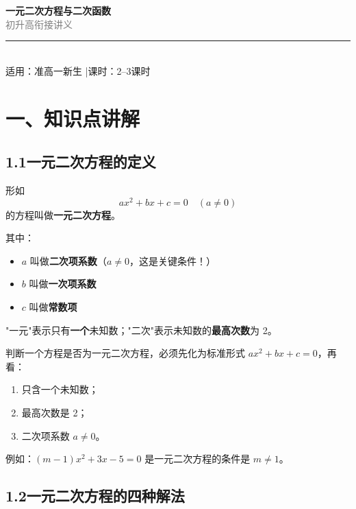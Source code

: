 \documentclass[12pt, a4paper]{ctexart}
\begin{document}
\begin{center}
{\Huge\bfseries\textcolor{mainblue}{一元二次方程与二次函数}}\\[12pt]
{\Large\textcolor{gray}{初升高衔接讲义}}\\[8pt]
\rule{0.6\textwidth}{1pt}\\[8pt]
{\normalsize 适用：准高一新生 \quad|\quad 课时：2--3课时}
\end{center}
\vspace{10pt}

\section*{\textcolor{mainblue}{一、知识点讲解}}

\subsection*{1.1\quad 一元二次方程的定义}

\begin{knowledgebox}
形如
\[
ax^2 + bx + c = 0 \quad (a \neq 0)
\]
的方程叫做\textbf{一元二次方程}。

其中：
\begin{itemize}[leftmargin=2em]
  \item $a$ 叫做\textbf{二次项系数}（$a \neq 0$，这是关键条件！）
  \item $b$ 叫做\textbf{一次项系数}
  \item $c$ 叫做\textbf{常数项}
\end{itemize}
"一元"表示只有\textbf{一个}未知数；"二次"表示未知数的\textbf{最高次数}为 2。
\end{knowledgebox}

\begin{warnbox}[易错提醒]
判断一个方程是否为一元二次方程，必须先化为标准形式 $ax^2+bx+c=0$，再看：
\begin{enumerate}[leftmargin=2em]
  \item 只含一个未知数；
  \item 最高次数是 2；
  \item 二次项系数 $a \neq 0$。
\end{enumerate}
例如：$(m-1)x^2 + 3x - 5 = 0$ 是一元二次方程的条件是 $m \neq 1$。
\end{warnbox}

\subsection*{1.2\quad 一元二次方程的四种解法}
\end{document}
